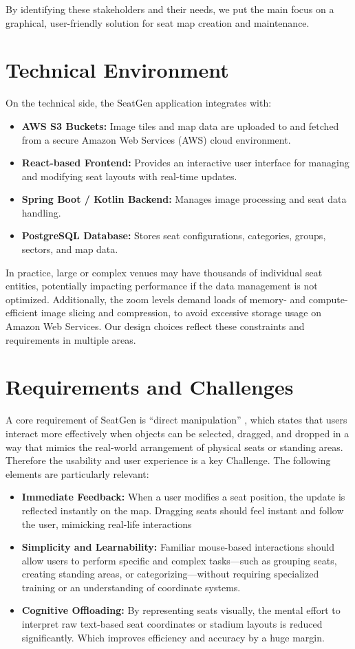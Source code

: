 By identifying these stakeholders and their needs, we put the main focus on a graphical, user-friendly solution for seat map creation and maintenance.

\section{Technical Environment}
On the technical side, the SeatGen application integrates with:
\begin{itemize}
    \item \textbf{AWS S3 Buckets:} Image tiles and map data are uploaded to and fetched from a secure Amazon Web Services (AWS) cloud environment.
    \item \textbf{React-based Frontend:} Provides an interactive user interface for managing and modifying seat layouts with real-time updates.  
    \item \textbf{Spring Boot / Kotlin Backend:} Manages image processing and seat data handling.  
    \item \textbf{PostgreSQL Database:} Stores seat configurations, categories, groups, sectors, and map data.  
\end{itemize}

In practice, large or complex venues may have thousands of individual seat entities, potentially impacting performance if the data management is not optimized. Additionally, the zoom levels demand loads of memory- and compute-efficient image slicing and compression, to avoid excessive storage usage on Amazon Web Services. Our design choices reflect these constraints and requirements in multiple areas.

\section{Requirements and Challenges}
A core requirement of SeatGen is “direct manipulation” \cite{Hutchins01121985}, which states that users interact more effectively when objects can be selected, dragged, and dropped in a way that mimics the real-world arrangement of physical seats or standing areas. Therefore the usability and user experience is a key Challenge. The following elements are particularly relevant:

\begin{itemize}
    \item \textbf{Immediate Feedback:} When a user modifies a seat position, the update is reflected instantly on the map. Dragging seats should feel instant and follow the user, mimicking real-life interactions
    \item \textbf{Simplicity and Learnability:} Familiar mouse-based interactions should allow users to perform specific and complex tasks—such as grouping seats, creating standing areas, or categorizing—without requiring specialized training or an understanding of coordinate systems.
    \item \textbf{Cognitive Offloading:} By representing seats visually, the mental effort to interpret raw text-based seat coordinates or stadium layouts is reduced significantly. Which improves efficiency and accuracy by a huge margin.
\end{itemize}

